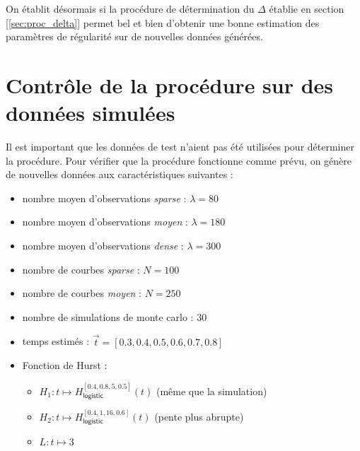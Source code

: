 On établit désormais si la procédure de détermination du $\Delta$ établie en section [\ref{sec:proc_delta}] permet bel et bien d'obtenir une bonne estimation des paramètres de régularité sur de nouvelles données générées.

\section{Contrôle de la procédure sur des données simulées}

Il est important que les données de test n'aient pas été utilisées pour déterminer la procédure. Pour vérifier que la procédure fonctionne comme prévu, on génère de nouvelles données aux caractéristiques suivantes : 

\begin{itemize}
\item nombre moyen d'observations \emph{sparse} : $\lambda = 80$
\item nombre moyen d'observations \emph{moyen} : $\lambda = 180$
\item nombre moyen d'observations \emph{dense}  : $\lambda = 300$
\end{itemize}

\begin{itemize}
\item nombre de courbes \emph{sparse} : $N = 100$
\item nombre de courbes \emph{moyen} : $N=250$
\end{itemize}

\begin{itemize}
\item nombre de simulations de monte carlo : 30
\item temps estimés : $\vec t = [0.3, 0.4, 0.5, 0.6, 0.7, 0.8]$
\item Fonction de Hurst :


\noindent\begin{itemize}
    \item $H_1 : t \mapsto H^{[0.4, 0.8, 5, 0.5]}_{\textsf{logistic}}(t)$ (même que la simulation)
    \item $H_2 : t \mapsto H^{[0.4, 1, 16, 0.6]}_{\textsf{logistic}}(t)$ (pente plus abrupte)
    \item $L : t \mapsto 3$
  \end{itemize}
\end{itemize}

